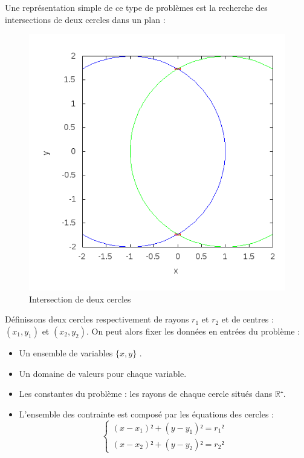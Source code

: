 Une représentation simple de ce type de problèmes est la recherche des intersections de deux cercles dans un plan : 
\begin{figure}[h] %
  \center
\includegraphics[scale=0.43]{img/circle-circle}
  \caption{Intersection de deux cercles} %
 \label{fig:Deuxcerlces} %
\end{figure} %

Définissons deux cercles respectivement de rayons  $r_1$ et $r_2$ et de centres : $(x_1,y_1)$ et $(x_2,y_2)$.
On peut alors fixer les données en entrées du problème :

\begin{itemize}
\item
Un ensemble de variables $\{x,y\}$ .
\item
Un domaine de valeurs pour chaque variable. 
\item
Les constantes du problème : les rayons de chaque cercle situés dans  $\mathbb{R⁺}$.
\item
L'ensemble des contrainte est composé par les équations des cercles :
\begin{equation}\label{eq}
\begin{cases}
(x-x_1)²+(y-y_1)² = r_1²\\
(x-x_2)²+(y-y_2)² = r_2²
\end{cases}
\end{equation}




\end{itemize}


